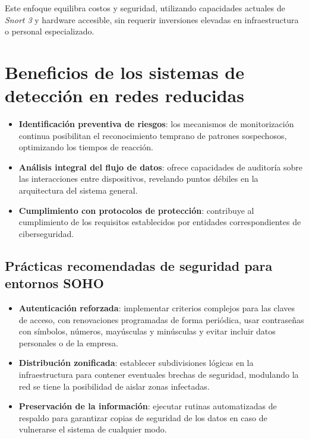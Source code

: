 \documentclass[12pt,a4paper]{report}
\begin{document}
Este enfoque equilibra costos y seguridad, utilizando capacidades actuales de \textit{Snort 3} y hardware accesible, sin requerir inversiones elevadas en infraestructura o personal especializado.



\section{Beneficios de los sistemas de detección en redes reducidas}

\begin{itemize}
	\item \textbf{Identificación preventiva de riesgos}: los mecanismos de monitorización continua posibilitan el reconocimiento temprano de patrones sospechosos, optimizando los tiempos de reacción.
	\item \textbf{Análisis integral del flujo de datos}: ofrece capacidades de auditoría sobre las interacciones entre dispositivos, revelando puntos débiles en la arquitectura del sistema general.
	\item \textbf{Cumplimiento con protocolos de protección}: contribuye al cumplimiento de los requisitos establecidos por entidades correspondientes de ciberseguridad.
\end{itemize}

\subsection{Prácticas recomendadas de seguridad para entornos SOHO}

\begin{itemize}
	\item \textbf{Autenticación reforzada}: implementar criterios complejos para las claves de acceso, con renovaciones programadas de forma periódica, usar contraseñas con símbolos, números, mayúsculas y minúsculas y evitar incluir datos personales o de la empresa.
	\item \textbf{Distribución zonificada}: establecer subdivisiones lógicas en la infraestructura para contener eventuales brechas de seguridad, modulando la red se tiene la posibilidad de aislar zonas infectadas.
	\item \textbf{Preservación de la información}: ejecutar rutinas automatizadas de respaldo para garantizar copias de seguridad de los datos en caso de vulnerarse el sistema de cualquier modo.
\end{itemize}

\end{document}
